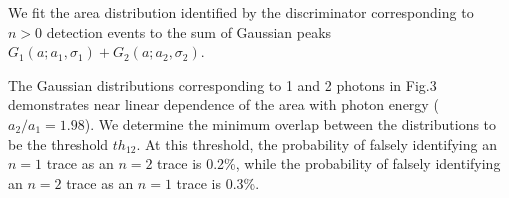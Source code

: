 We fit the area distribution 
identified by the discriminator 
corresponding to $n>0$ detection events 
to the sum of Gaussian peaks~$G_1(a; a_1, \sigma_1)+G_2(a; a_2, \sigma_2)$.

The Gaussian distributions corresponding to 1 and 2 photons in Fig.3 demonstrates near linear dependence of the area with photon energy ($a_2/a_1 = 1.98$).
%
We determine the minimum overlap between the distributions to be the threshold $th_{12}$. 
At this threshold, 
the probability of falsely identifying an $n=1$ trace as an $n=2$ trace is 0.2\%,
while
the probability of falsely identifying an $n=2$ trace as an $n=1$ trace is 0.3\%.
\vspace{1cm}
%
%

